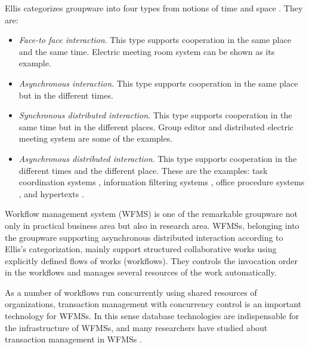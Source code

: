 Ellis categorizes groupware into four types from notions of time and space
\cite{ellis:cacm91}.  They are:
\begin{itemize}
 \setlength{\itemsep}{0mm}
 \setlength{\parskip}{0mm}
 \item  \emph{Face-to face interaction}.  This type supports cooperation
	in the same place and the same time.  Electric meeting room
        system \cite{stefik:cacm87, stefik:toois87} can be shown as its
	example.
 \item  \emph{Asynchronous interaction}.  This type supports cooperation
	in the same place but in the different times.
 \item  \begin{sloppypar}
	 \emph{Synchronous distributed interaction}.  This type supports
	 cooperation in the same time but in the different places.
	 Group editor \cite{foster:cscw86} and distributed
	 electric meeting system \cite{crowley:cscw90} are some of the
	 examples.
	\end{sloppypar}
 \item  \emph{Asynchronous distributed interaction}.  This type supports
	cooperation in the different times and the different place.
	These are the examples: task coordination systems
        \cite{winograd:book86, flores:toois88}, information filtering systems
	\cite{malone:toois87}, office procedure systems
	\cite{ishii:jip91, suchman:toois83, croft:toois84}, and
	hypertexts \cite{conklin:toois88}.
\end{itemize}

\begin{sloppypar}
 Workflow management system (WFMS) \cite{georgakopoulos:jdps95} is one
 of the remarkable groupware not only in practical business area but also
 in research area.  WFMSs, belonging into the groupware supporting
 asynchronous distributed interaction according to Ellis's
 categorization, mainly support structured collaborative works using
 explicitly defined flows of works (workflows).  They controls the
 invocation order in the workflows and manages several resources of the
 work automatically.
\end{sloppypar}

As a number of workflows run concurrently using shared resources of
organizations, transaction management with concurrency control is an
important technology for WFMSs.  In this sense database technologies are
indispensable for the infrastructure of WFMSs, and many researchers have
studied about transaction management in WFMSs
\cite{georgakopoulos:ijicis94, rusinkiewicz:adbis94,%
krishnakumar:jdps95, alonso:icde96}.

